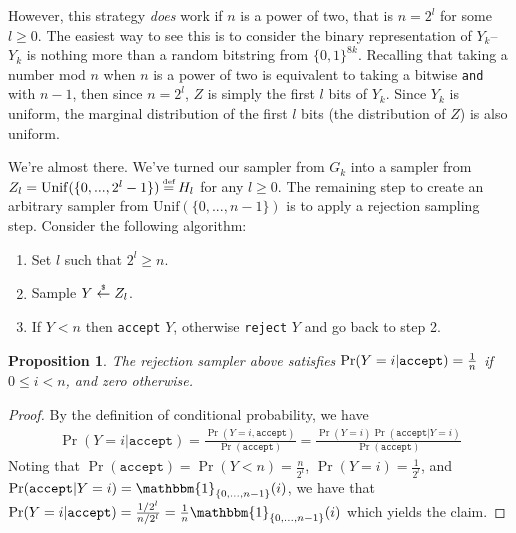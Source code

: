 \documentclass[10pt]{article}
\newtheorem{myprop}{Proposition}
\newcommand{\ind}{\mathbbm{1}}
\newcommand{\Unif}{\mathrm{Unif}}
\newcommand\defeq{\stackrel{\mathclap{\normalfont\tiny\mbox{def}}}{=}}
\newcommand\rgets{\stackrel{\mathclap{\normalfont\tiny\mbox{\$}}}{\gets}}
\begin{document}
However, this strategy \emph{does} work if $n$ is a power of two, that is
$n=2^l$ for some $l \geq 0$. The easiest way to see this is to consider the
binary representation of $Y_k$-- $Y_k$ is nothing more than a random bitstring
from $\{0,1\}^{8k}$. Recalling that taking a number mod $n$ when $n$ is a power
of two is equivalent to taking a bitwise \verb|and| with $n-1$, then since
$n=2^{l}$, $Z$ is simply the first $l$ bits of $Y_k$. Since $Y_k$ is uniform,
the marginal distribution of the first $l$ bits (the distribution of $Z$) is
also uniform.

We're almost there. We've turned our sampler from $G_k$ into a sampler from
$Z_l = \Unif(\{0, ..., 2^l - 1\}) \defeq H_l$ for any $l \geq 0$. The remaining
step to create an arbitrary sampler from $\Unif(\{0,...,n-1\})$ is to apply a
rejection sampling step. Consider the following algorithm:
\begin{enumerate}
  \item Set $l$ such that $2^l \geq n$.
  \item Sample $Y \rgets Z_l$.
  \item If $Y < n$ then \verb|accept| $Y$, otherwise \verb|reject| $Y$ and go back to step 2.
\end{enumerate}
\begin{myprop}
The rejection sampler above satisfies $\Pr(Y=i | \normalfont{\texttt{accept}})
= \frac{1}{n}$ if $0 \leq i < n$, and zero otherwise.
\end{myprop}
\begin{proof}
By the definition of conditional probability, we have
\begin{align*}
  \Pr(Y=i|\texttt{accept}) = \frac{\Pr(Y=i, \texttt{accept})}{\Pr(\texttt{accept})} 
  = \frac{\Pr(Y=i)\Pr(\texttt{accept}|Y=i)}{\Pr(\texttt{accept})}
\end{align*}
Noting that $\Pr(\texttt{accept}) = \Pr(Y<n) = \frac{n}{2^l}$, $\Pr(Y=i)=\frac{1}{2^l}$, and 
$\Pr(\texttt{accept}|Y=i) = \ind_{\{0, ..., n-1\}}(i)$, we have 
that $\Pr(Y=i|\texttt{accept}) = \frac{1/2^l}{n/2^l} = \frac{1}{n} \ind_{\{0, ..., n-1\}}(i)$
which yields the claim.
\end{proof}
\end{document}
